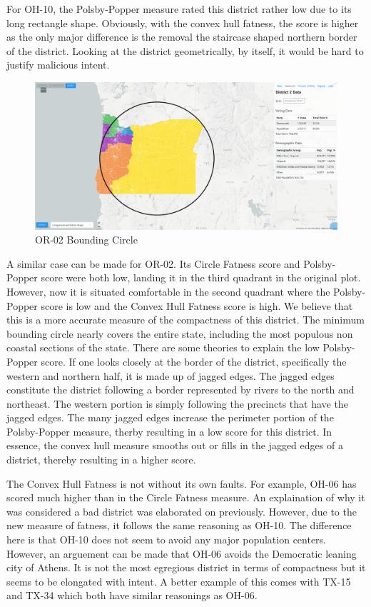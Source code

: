 \documentclass[letterpaper]{article}
\begin{document}
For OH-10, the Polsby-Popper measure rated this district rather low due to its long rectangle shape. Obviously, with the convex hull fatness, the score is higher as the only major difference is the removal the staircase shaped northern border of the district. Looking at the district geometrically, by itself, it would be hard to justify malicious intent.

\begin{figure}[H]
	\includegraphics[width=\linewidth]{./figures/OR-02-BoundingCircle.png}
	\caption{OR-02 Bounding Circle}
	\label{fig:or02boundingCircle}
\end{figure}

A similar case can be made for OR-02. Its Circle Fatness score and Polsby-Popper score were both low, landing it in the third quadrant in the original plot. However, now it is situated comfortable in the second quadrant where the Polsby-Popper score is low and the Convex Hull Fatness score is high. We believe that this is a more accurate measure of the compactness of this district. The minimum bounding circle nearly covers the entire state, including the most populous non coastal sections of the state. There are some theories to explain the low Polsby-Popper score. If one looks closely at the border of the district, specifically the western and northern half, it is made up of jagged edges. The jagged edges constitute the district following a border represented by rivers to the north and northeast. The western portion is simply following the precincts that have the jagged edges. The many jagged edges increase the perimeter portion of the Polsby-Popper measure, therby resulting in a low score for this district. In essence, the convex hull measure smooths out or fills in the jagged edges of a district, thereby resulting in a higher score.

The Convex Hull Fatness is not without its own faults. For example, OH-06 has scored much higher than in the Circle Fatness measure. An explaination of why it was considered a bad district was elaborated on previously. However, due to the new measure of fatness, it follows the same reasoning as OH-10. The difference here is that OH-10 does not seem to avoid any major population centers. However, an arguement can be made that OH-06 avoids the Democratic leaning city of Athens. It is not the most egregious district in terms of compactness but it seems to be elongated with intent. A better example of this comes with TX-15 and TX-34 which both have similar reasonings as OH-06.
\end{document}
